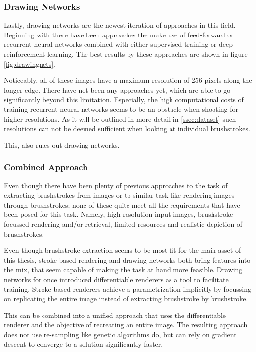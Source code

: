 \subsubsection{Drawing Networks}
Lastly, drawing networks are the newest iteration of approaches in this field.
Beginning with  there have been approaches the make use
of feed-forward or recurrent neural networks combined with either supervised training
or deep reinforcement learning.
The best results by these approaches are shown in figure \ref{fig:drawingnets}.

Noticeably, all of these images have a maximum resolution of 256 pixels along the
longer edge.
There have not been any approaches yet, which are able to go significantly beyond
this limitation.
Especially, the high computational costs of training recurrent neural networks seems
to be an obstacle when shooting for higher resolutions.
As it will be outlined in more detail in \ref{ssec:dataset} such resolutions can not
be deemed sufficient when looking at individual brushstrokes.

This, also rules out drawing networks.

\subsubsection{Combined Approach}

Even though there have been plenty of previous approaches to the task of extracting brushstrokes from images or to similar task like rendering images through brushstrokes; none of these quite meet all the requirements that have been posed for this task.
Namely, high resolution input images, brushstroke focussed rendering and/or retrieval, limited resources and realistic depiction of brushstrokes.

Even though brushstroke extraction seems to be most fit for the main asset of this thesis, stroke based rendering and drawing networks both bring features into the mix, that seem capable of making the task at hand more feasible.
Drawing networks for once introduced differentiable renderers as a tool to facilitate training.
Stroke based renderers achieve a parametrization implicitly by focussing on replicating the entire image instead of extracting brushstroke by brushstroke.

This can be combined into a unified approach that uses the differentiable renderer and the objective of recreating an entire image.
The resulting approach does not use re-sampling like genetic algorithms do, but can rely on gradient descent to converge to a solution significantly faster.

